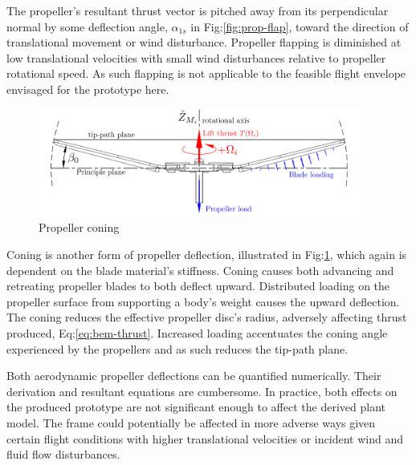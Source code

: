 \par
The propeller's resultant thrust vector is pitched away from its perpendicular normal by some deflection angle, $\alpha_{1s}$ in Fig:\ref{fig:prop-flap}, toward the direction of translational movement or wind disturbance. Propeller flapping is diminished at low translational velocities with small wind disturbances relative to propeller rotational speed. As such flapping is not applicable to the feasible flight envelope envisaged for the prototype here.
\par
\begin{figure}[hbtp]
\centering
\includegraphics[width=0.95\textwidth]{figs/prop-coning}
\caption{Propeller coning}
\label{fig:prop-coning}
\end{figure}
Coning is another form of propeller deflection, illustrated in Fig:\ref{fig:prop-coning}, which again is dependent on the blade material's stiffness. Coning causes both advancing and retreating propeller blades to both deflect upward. Distributed loading on the propeller surface from supporting a body's weight causes the upward deflection. The coning reduces the effective propeller disc's radius, adversely affecting thrust produced, Eq:\ref{eq:bem-thrust}. Increased loading accentuates the coning angle experienced by the propellers and as such reduces the tip-path plane.
\par
Both aerodynamic propeller deflections can be quantified numerically. Their derivation and resultant equations are cumbersome. In practice, both effects on the produced prototype are not significant enough to affect the derived plant model. The frame could potentially be affected in more adverse ways given certain flight conditions with higher translational velocities or incident wind and fluid flow disturbances.
